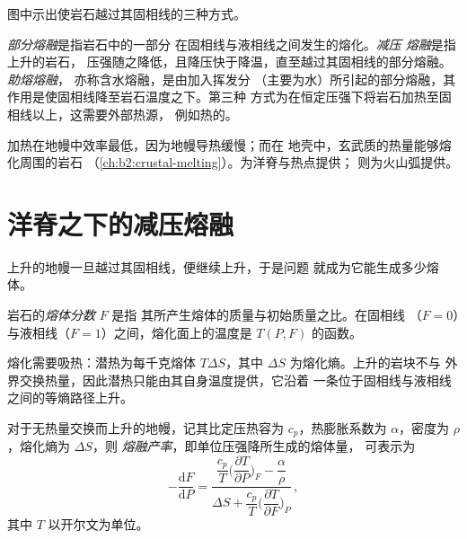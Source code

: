 图中示出使岩石越过其固相线的三种方式。

\begin{definition}\label{def:b2:mantle-melting:melting}
\emph{部分熔融}是指岩石中的一部分
在固相线与液相线之间发生的熔化。\emph{减压
熔融}是指上升的岩石，
压强随之降低，且降压快于降温，直至越过其固相线的部分熔融。
\emph{助熔熔融}，
亦称含水熔融，是由加入挥发分
（主要为水）所引起的部分熔融，其作用是使固相线降至岩石温度之下。第三种
方式为在恒定压强下将岩石加热至固相线以上，这需要外部热源，
例如热的。
\end{definition}

加热在地幔中效率最低，因为地幔导热缓慢；而在
地壳中，玄武质的热量能够熔化周围的岩石
（\cref{ch:b2:crustal-melting}）。为洋脊与热点提供；
则为火山弧提供。

\section{洋脊之下的减压熔融}\label{sec:b2:mantle-melting:decompression}

上升的地幔一旦越过其固相线，便继续上升，于是问题
就成为它能生成多少熔体。

\begin{definition}[熔体分数]\label{def:b2:mantle-melting:fraction}
岩石的\emph{熔体分数} $F$ 是指
其所产生熔体的质量与初始质量之比。在固相线
（$F = 0$）与液相线（$F = 1$）之间，熔化面上的温度是
$T(P, F)$ 的函数。
\end{definition}

熔化需要吸热：潜热为每千克熔体 $T\Delta S$，其中
$\Delta S$ 为熔化熵。上升的岩块不与
外界交换热量，因此潜热只能由其自身温度提供，它沿着
一条位于固相线与液相线之间的等熵路径上升。

\begin{proposition}[等熵熔融产率]\label{prop:b2:mantle-melting:productivity}
对于无热量交换而上升的地幔，记其比定压热容为 $c_p$，热膨胀系数为
$\alpha$，密度为 $\rho$，熔化熵为 $\Delta S$，则
\emph{熔融产率}，即单位压强降所生成的熔体量，
可表示为
\[
  -\frac{\mathrm dF}{\mathrm dP} =
  \frac{\dfrac{c_p}{T}\Big(\dfrac{\partial T}{\partial P}\Big)_F - \dfrac{\alpha}{\rho}}
       {\Delta S + \dfrac{c_p}{T}\Big(\dfrac{\partial T}{\partial F}\Big)_P}\,,
\]
其中 $T$ 以开尔文为单位。
\end{proposition}

